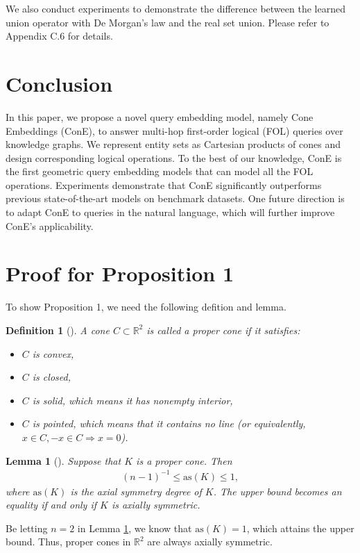 \documentclass{article}
\newtheorem{lemma}{Lemma}
\newtheorem{definition}{Definition}
\begin{document}
We also conduct experiments to demonstrate the difference between the learned union operator with De Morgan's law and the real set union. Please refer to Appendix C.6 for details.



\vspace{-1mm}
\section{Conclusion}\label{sec:conclusion}
\vspace{-2mm}
In this paper, we propose a novel query embedding model, namely Cone Embeddings (ConE), to answer multi-hop first-order logical (FOL) queries over knowledge graphs.
We represent entity sets as Cartesian products of cones and design corresponding logical operations. To the best of our knowledge, ConE is the first geometric query embedding models that can model all the FOL operations. Experiments demonstrate that ConE significantly outperforms previous state-of-the-art models on benchmark datasets. One future direction is to adapt ConE to queries in the natural language, which will further improve ConE's applicability.




\newpage
\appendix
\section{Proof for Proposition 1}
To show Proposition 1, we need the following defition and lemma.

\begin{definition}[\citet{boyd}]
A cone $C\subset \mathbb{R}^2$ is called a proper cone if it satisfies: 
\begin{itemize}[leftmargin=10mm]
    \item $C$ is convex,
    \item $C$ is closed,
    \item $C$ is solid, which means it has nonempty interior,
    \item $C$ is pointed, which means that it contains no line (or equivalently, $x\in C, -x\in C\Rightarrow x=0$).
\end{itemize}
\end{definition}
\vspace{3mm}

\begin{lemma}[\citet{lemma_sym}]\label{lemma:sym_cone}
Suppose that $K$ is a proper cone. Then
\begin{align*}
    (n-1)^{-1}\le \text{as}(K)\le 1,
\end{align*}
where $\text{as}(K)$ is the axial symmetry degree of $K$. 
The upper bound becomes an equality if and only if $K$ is axially symmetric.
\end{lemma}
Be letting $n=2$ in Lemma \ref{lemma:sym_cone}, we know that $\text{as}(K)=1$, which attains the upper bound. Thus, proper cones in $\mathbb{R}^2$ are always axially symmetric.
\end{document}
